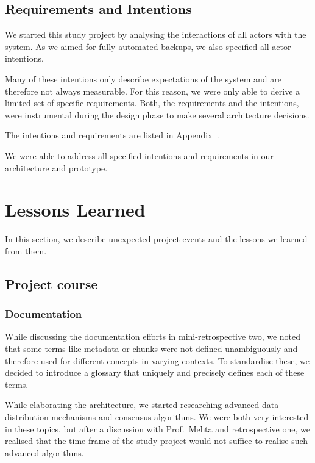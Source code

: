 \subsection{Requirements and Intentions}
We started this study project by analysing the interactions of all actors with the system.
As we aimed for fully automated backups, we also specified all actor intentions.

Many of these intentions only describe expectations of the system and are therefore not always measurable. For this reason, we were only able to derive a limited set of specific requirements. Both, the requirements and the intentions, were instrumental during the design phase to make several architecture decisions.

The intentions and requirements are listed in Appendix~.

We were able to address all specified intentions and requirements in our architecture and prototype.


\section{Lessons Learned}

In this section, we describe unexpected project events and the lessons we learned from them.

\subsection{Project course}
\subsubsection{Documentation}
While discussing the documentation efforts in mini-retrospective two, we noted that some terms like metadata or chunks were not defined unambiguously and therefore used for different concepts in varying contexts. To standardise these, we decided to introduce a glossary that uniquely and precisely defines each of these terms.

While elaborating the architecture, we started researching advanced data distribution mechanisms and consensus algorithms. We were both very interested in these topics, but after a discussion with Prof.~Mehta and retrospective one, we realised that the time frame of the study project would not suffice to realise such advanced algorithms.

